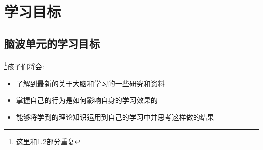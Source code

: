 \chapter{学习目标}


\section{脑波单元的学习目标}
\footnote{这里和1.2部分重复}孩子们将会:
      \begin{itemize}
        \item 了解到最新的关于大脑和学习的一些研究和资料
        \item 掌握自己的行为是如何影响自身的学习效果的
        \item 能够将学到的理论知识运用到自己的学习中并思考这样做的结果
      \end{itemize}  
 
